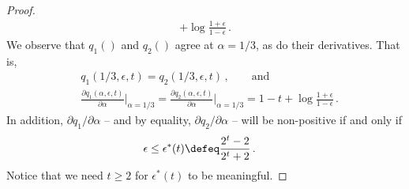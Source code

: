 \begin{proof}
\begin{align*}
+ \log \frac{1+\epsilon}{1-\epsilon} \, .
\end{align*}
We observe that $q_1()$ and $q_2()$ agree at $\alpha = 1/3$, as do their derivatives. That is,
\begin{align*}
&q_1(1/3, \epsilon, t) = q_2(1/3, \epsilon, t) \, , \qquad \text{and}\\
&\frac{\partial q_1(\alpha, \epsilon, t)}{\partial \alpha}\bigg\rvert_{\alpha = 1/3}
=
\frac{\partial q_2(\alpha, \epsilon, t)}{\partial \alpha}\bigg\rvert_{\alpha = 1/3}
= 
1 - t + \log \frac{1+\epsilon}{1-\epsilon} \, .
\end{align*}
In addition, $\partial q_1/\partial \alpha$ -- and by equality, $\partial q_2/\partial \alpha$  -- will be non-positive if and only if
\begin{align}
&\epsilon \leq \epsilon^*(t) \defeq \frac{2^t - 2}{2^t + 2} \label{eq:epsstar-moment}
\, .
\end{align}
Notice that we need $t \geq 2$ for $\epsilon^*(t)$ to be meaningful. 


\end{proof}
